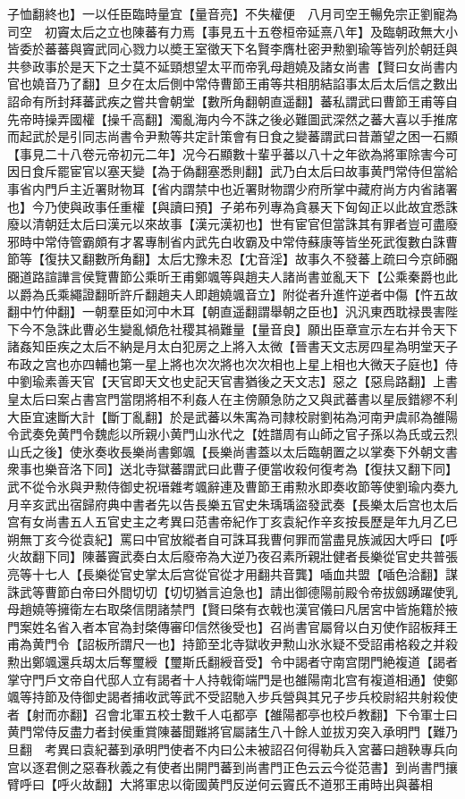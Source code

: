 子恤翻終也】一以任臣臨時量宜【量音亮】不失權便　八月司空王暢免宗正劉寵為司空　初竇太后之立也陳蕃有力焉【事見五十五卷桓帝延熹八年】及臨朝政無大小皆委於蕃蕃與竇武同心戮力以奬王室徵天下名賢李膺杜密尹勲劉瑜等皆列於朝廷與共參政事於是天下之士莫不延頸想望太平而帝乳母趙嬈及諸女尚書【賢曰女尚書内官也嬈音乃了翻】旦夕在太后側中常侍曹節王甫等共相朋結諂事太后太后信之數出詔命有所封拜蕃武疾之嘗共會朝堂【數所角翻朝直遥翻】蕃私謂武曰曹節王甫等自先帝時操弄國權【操千高翻】濁亂海内今不誅之後必難圖武深然之蕃大喜以手推席而起武於是引同志尚書令尹勲等共定計策會有日食之變蕃謂武曰昔蕭望之困一石顯【事見二十八卷元帝初元二年】况今石顯數十輩乎蕃以八十之年欲為將軍除害今可因日食斥罷宦官以塞天變【為于偽翻塞悉則翻】武乃白太后曰故事黄門常侍但當給事省内門戶主近署財物耳【省内謂禁中也近署財物謂少府所掌中藏府尚方内省諸署也】今乃使與政事任重權【與讀曰預】子弟布列專為貪暴天下匈匈正以此故宜悉誅廢以清朝廷太后曰漢元以來故事【漢元漢初也】世有宦官但當誅其有罪者豈可盡廢邪時中常侍管霸頗有才畧專制省内武先白收霸及中常侍蘇康等皆坐死武復數白誅曹節等【復扶又翻數所角翻】太后冘豫未忍【冘音淫】故事久不發蕃上疏曰今京師嚻嚻道路諠譁言侯覽曹節公乘昕王甫鄭颯等與趙夫人諸尚書並亂天下【公乘秦爵也此以爵為氏乘繩證翻昕許斤翻趙夫人即趙嬈颯音立】附從者升進忤逆者中傷【忤五故翻中竹仲翻】一朝羣臣如河中木耳【朝直遥翻謂舉朝之臣也】汎汎東西耽禄畏害陛下今不急誅此曹必生變亂傾危社稷其禍難量【量音良】願出臣章宣示左右并令天下諸姦知臣疾之太后不納是月太白犯房之上將入太微【晉書天文志房四星為明堂天子布政之宫也亦四輔也第一星上將也次次將也次次相也上星上相也大微天子庭也】侍中劉瑜素善天官【天官即天文也史記天官書猶後之天文志】惡之【惡烏路翻】上書皇太后曰案占書宫門當閉將相不利姦人在主傍願急防之又與武蕃書以星辰錯繆不利大臣宜速斷大計【斷丁亂翻】於是武蕃以朱㝢為司隸校尉劉祐為河南尹虞祁為雒陽令武奏免黄門令魏彪以所親小黄門山氷代之【姓譜周有山師之官子孫以為氏或云烈山氏之後】使氷奏收長樂尚書鄭颯【長樂尚書蓋以太后臨朝置之以掌奏下外朝文書衆事也樂音洛下同】送北寺獄蕃謂武曰此曹子便當收殺何復考為【復扶又翻下同】武不從令氷與尹勲侍御史祝瑨雜考颯辭連及曹節王甫勲氷即奏收節等使劉瑜内奏九月辛亥武出宿歸府典中書者先以告長樂五官史朱瑀瑀盜發武奏【長樂太后宫也太后宫有女尚書五人五官史主之考異曰范書帝紀作丁亥袁紀作辛亥按長歷是年九月乙巳朔無丁亥今從袁紀】罵曰中官放縱者自可誅耳我曹何罪而當盡見族滅因大呼曰【呼火故翻下同】陳蕃竇武奏白太后廢帝為大逆乃夜召素所親壯健者長樂從官史共普張亮等十七人【長樂從官史掌太后宫從官從才用翻共音龔】喢血共盟【喢色洽翻】謀誅武等曹節白帝曰外間切切【切切猶言迫急也】請出御德陽前殿令帝拔劔踴躍使乳母趙嬈等擁衛左右取棨信閉諸禁門【賢曰棨有衣戟也漢官儀曰凡居宮中皆施籍於掖門案姓名省入者本官為封棨傳審印信然後受也】召尚書官屬脅以白刃使作詔板拜王甫為黄門令【詔板所謂尺一也】持節至北寺獄收尹勲山氷氷疑不受詔甫格殺之并殺勲出鄭颯還兵刼太后奪璽綬【璽斯氏翻綬音受】令中謁者守南宫閉門絶複道【謁者掌守門戶文帝自代邸人立有謁者十人持戟衛端門是也雒陽南北宫有複道相通】使鄭颯等持節及侍御史謁者捕收武等武不受詔馳入步兵營與其兄子步兵校尉紹共射殺使者【射而亦翻】召會北軍五校士數千人屯都亭【雒陽都亭也校戶教翻】下令軍士曰黄門常侍反盡力者封侯重賞陳蕃聞難將官屬諸生八十餘人並拔刃突入承明門【難乃旦翻　考異曰袁紀蕃到承明門使者不内曰公未被詔召何得勒兵入宮蕃曰趙鞅專兵向宫以逐君側之惡春秋義之有使者出開門蕃到尚書門正色云云今從范書】到尚書門攘臂呼曰【呼火故翻】大將軍忠以衛國黄門反逆何云竇氏不道邪王甫時出與蕃相